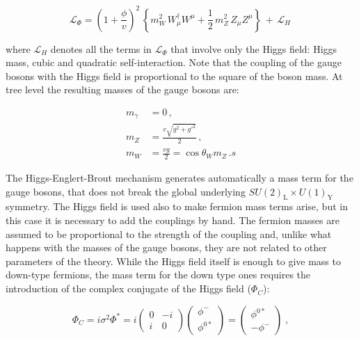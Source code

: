 \begin{equation}
\mathcal{L}_{\Phi} = \left(1+\frac{\phi}{v}\right)^2 \,
\left\{ m_W^2\, W_\mu^\dagger W^\mu
+ \frac{1}{2}\, m_Z^2\, Z_\mu Z^\mu \right\}\, +\, \mathcal{L}_H\, 
\end{equation}

\noindent where $\mathcal{L}_H$ denotes all the terms in $\mathcal{L}_{\Phi}$ that involve only the Higgs field: Higgs mass, cubic and quadratic self-interaction. Note that the coupling of the gauge bosons with the Higgs field is proportional to the square of the boson mass.
At tree level the resulting masses of the gauge bosons are:

\begin{equation}
\begin{aligned}
m_\gamma &= 0 \, ,\\
m_Z &= \frac{v \sqrt{g^2 + g'^2}}{2} \, , \\
m_W &= \frac{vg}{2} =  \cos\theta_W m_Z \, .s
\end{aligned}
\end{equation}


The Higgs-Englert-Brout mechanism generates automatically a mass term for the gauge bosons, that does not break the global underlying $SU(2)_\mathrm{L} \times U(1)_\mathrm{Y}$ symmetry. The Higgs field is used also to make fermion mass terms arise, but in this case it is necessary to add the couplings by hand. The fermion masses are assumed to be proportional to the strength of the coupling and, unlike what happens with the masses of the gauge bosons, they are not related to other parameters of the theory. While the Higgs field itself is enough to give mass to down-type fermions, the mass term for the down type ones requires the introduction of the complex conjugate of the Higgs field ($\Phi_C$):

\begin{equation}
 \Phi_C = i \sigma^2 \Phi^* 
	= i \left( \begin{array}{cc} 0 & -i \\ i & 0 \end{array} \right) 
	\left( \begin{array}{c} \phi^- \\ \phi^{0*} \end{array} \right)
	= \left( \begin{array}{c} \phi^{0*} \\ - \phi^- \end{array} \right) \; ,
\end{equation}

